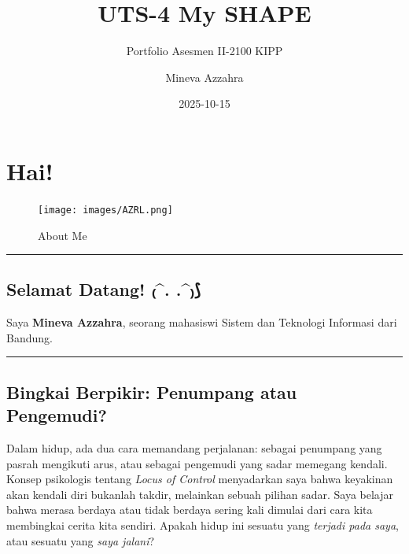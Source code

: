 \documentclass[
  letterpaper,
  DIV=11,
  numbers=noendperiod]{scrreprt}
\title{UTS-4 My SHAPE}
\subtitle{Portfolio Asesmen II-2100 KIPP}
\author{Mineva Azzahra}
\date{2025-10-15}
\renewcommand*\contentsname{Table of contents}
\newcommand\contentsname{Table of contents}
\begin{document}
\maketitle

\renewcommand*\contentsname{Table of contents}
{
\hypersetup{linkcolor=}
\setcounter{tocdepth}{2}
\tableofcontents
}


\chapter*{Hai!}\label{hai}


\begin{figure}[H]

{\centering \texttt{[image: images/AZRL.png]}

}

\caption{About Me}

\end{figure}%

\begin{center}\rule{0.5\linewidth}{0.5pt}\end{center}

\section*{Selamat Datang! ₍\^{}. .\^{}₎⟆}\label{selamat-datang-.-.}


Saya \textbf{Mineva Azzahra}, seorang mahasiswi Sistem dan Teknologi
Informasi dari Bandung.

\begin{center}\rule{0.5\linewidth}{0.5pt}\end{center}

\section*{Bingkai Berpikir: Penumpang atau
Pengemudi?}\label{bingkai-berpikir-penumpang-atau-pengemudi}


Dalam hidup, ada dua cara memandang perjalanan: sebagai penumpang yang
pasrah mengikuti arus, atau sebagai pengemudi yang sadar memegang
kendali. Konsep psikologis tentang \emph{Locus of Control} menyadarkan
saya bahwa keyakinan akan kendali diri bukanlah takdir, melainkan sebuah
pilihan sadar. Saya belajar bahwa merasa berdaya atau tidak berdaya
sering kali dimulai dari cara kita membingkai cerita kita sendiri.
Apakah hidup ini sesuatu yang \emph{terjadi pada saya}, atau sesuatu
yang \emph{saya jalani}?
\end{document}
